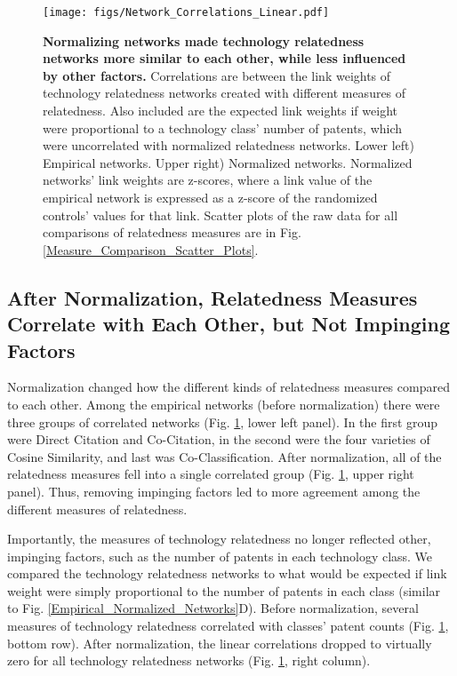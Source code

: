 \documentclass[pre,reprint,groupedaddress,superscriptaddress]{revtex4-1}
\begin{document}
\begin{figure}[]
\begin{center}
\texttt{[image: figs/Network\_Correlations\_Linear.pdf]} 
\end{center}
\caption{\textbf{Normalizing networks made technology relatedness networks more similar to each other, while less influenced by other factors.}  Correlations are between the link weights of technology relatedness networks created with different measures of relatedness. Also included are the expected link weights if weight were proportional to a technology class' number of patents, which were uncorrelated with normalized relatedness networks. 
Lower left) Empirical networks.
Upper right) Normalized networks. Normalized networks' link weights are z-scores, where a link value of the empirical network is expressed as a z-score of the randomized controls' values for that link. Scatter plots of the raw data for all comparisons of relatedness measures are in Fig. \ref{Measure_Comparison_Scatter_Plots}.
}\label{measure_correlations}
\end{figure}

\subsection{After Normalization, Relatedness Measures Correlate with Each Other, but Not Impinging Factors}

Normalization changed how the different kinds of relatedness measures compared to each other. Among the empirical networks (before normalization) there were three groups of correlated networks (Fig. \ref{measure_correlations}, lower left panel). In the first group were Direct Citation and Co-Citation, in the second were the four varieties of Cosine Similarity, and last was Co\hyp{}Classification.
After normalization, all of the relatedness measures fell into a single correlated group (Fig. \ref{measure_correlations}, upper right panel). Thus, removing impinging factors led to more agreement among the different measures of relatedness.

Importantly, the measures of technology relatedness no longer reflected other, impinging factors, such as the number of patents in each technology class. We compared the technology relatedness networks to what would be expected if link weight were simply proportional to the number of patents in each class (similar to Fig. \ref{Empirical_Normalized_Networks}D). Before normalization, several measures of technology relatedness correlated with classes' patent counts (Fig. \ref{measure_correlations}, bottom row). After normalization, the linear correlations dropped to virtually zero for all technology relatedness networks (Fig. \ref{measure_correlations}, right column).
\end{document}

